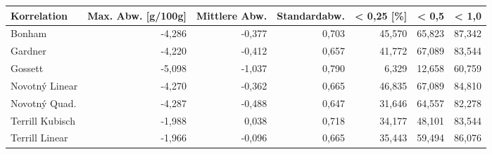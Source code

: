 \begin{tabular}{lrrrrrr}
\toprule
    Korrelation &  Max. Abw. [g/100g] &  Mittlere Abw. &  Standardabw. &  < 0,25 [\%] &  < 0,5 &  < 1,0 \\
\midrule
         Bonham &              -4,286 &         -0,377 &         0,703 &      45,570 & 65,823 & 87,342 \\
        Gardner &              -4,220 &         -0,412 &         0,657 &      41,772 & 67,089 & 83,544 \\
        Gossett &              -5,098 &         -1,037 &         0,790 &       6,329 & 12,658 & 60,759 \\
 Novotný Linear &              -4,270 &         -0,362 &         0,665 &      46,835 & 67,089 & 84,810 \\
  Novotný Quad. &              -4,287 &         -0,488 &         0,647 &      31,646 & 64,557 & 82,278 \\
Terrill Kubisch &              -1,988 &          0,038 &         0,718 &      34,177 & 48,101 & 83,544 \\
 Terrill Linear &              -1,966 &         -0,096 &         0,665 &      35,443 & 59,494 & 86,076 \\
\bottomrule
\end{tabular}
